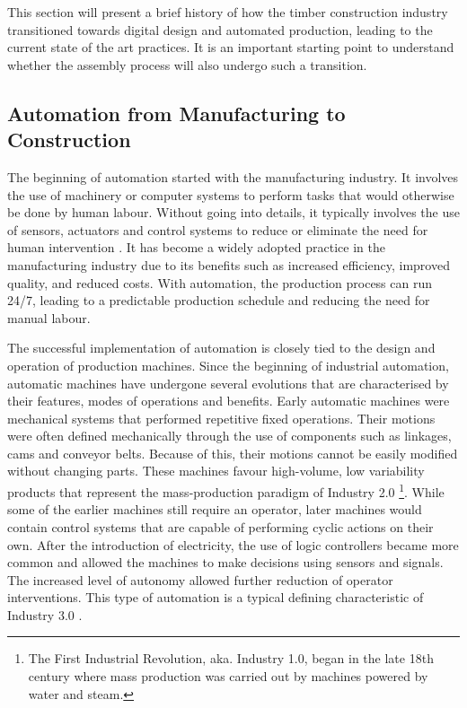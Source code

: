 This section will present a brief history of how the timber construction industry transitioned towards digital design and automated production, leading to the current state of the art practices. It is an important starting point to understand whether the assembly process will also undergo such a transition. 

\subsection{Automation from Manufacturing to Construction}

The beginning of automation started with the manufacturing industry. It involves the use of machinery or computer systems to perform tasks that would otherwise be done by human labour. Without going into details, it typically involves the use of sensors, actuators and control systems to reduce or eliminate the need for human intervention \parencite{nofSpringerHandbookAutomation2009}. It has become a widely adopted practice in the manufacturing industry due to its benefits such as increased efficiency, improved quality, and reduced costs. With automation, the production process can run 24/7, leading to a predictable production schedule and reducing the need for manual labour. 

The successful implementation of automation is closely tied to the design and operation of production machines. Since the beginning of industrial automation, automatic machines have undergone several evolutions that are characterised by their features, modes of operations and benefits. Early automatic machines were mechanical systems that performed repetitive fixed operations. Their motions were often defined mechanically through the use of components such as linkages, cams and conveyor belts. Because of this, their motions cannot be easily modified without changing parts. These machines favour high-volume, low variability products that represent the mass-production paradigm of Industry 2.0
\footnote{ The First Industrial Revolution, aka. Industry 1.0, began in the late 18th century where mass production was carried out by machines powered by water and steam.}.
While some of the earlier machines still require an operator, later machines would contain control systems that are capable of performing cyclic actions on their own. After the introduction of electricity, the use of logic controllers became more common and allowed the machines to make decisions using sensors and signals. The increased level of autonomy allowed further reduction of operator interventions. This type of automation is a typical defining characteristic of Industry 3.0 \parencite{mengesNewCyberPhysicalMaking2015,yinEvolutionProductionSystems2018}. 


